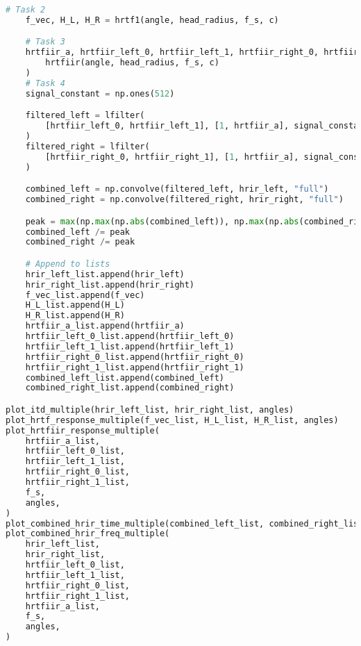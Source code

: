 \begin{lstlisting}[language=Python, caption={main.py}, label={lst:main.py}]
    # Task 2
    f_vec, H_L, H_R = hrtf1(angle, head_radius, f_s, c)

    # Task 3
    hrtfiir_a, hrtfiir_left_0, hrtfiir_left_1, hrtfiir_right_0, hrtfiir_right_1 = (
        hrtfiir(angle, head_radius, f_s, c)
    )
    # Task 4
    signal_constant = np.ones(512)

    filtered_left = lfilter(
        [hrtfiir_left_0, hrtfiir_left_1], [1, hrtfiir_a], signal_constant
    )
    filtered_right = lfilter(
        [hrtfiir_right_0, hrtfiir_right_1], [1, hrtfiir_a], signal_constant
    )

    combined_left = np.convolve(filtered_left, hrir_left, "full")
    combined_right = np.convolve(filtered_right, hrir_right, "full")

    peak = max(np.max(np.abs(combined_left)), np.max(np.abs(combined_right)))
    combined_left /= peak
    combined_right /= peak

    # Append to lists
    hrir_left_list.append(hrir_left)
    hrir_right_list.append(hrir_right)
    f_vec_list.append(f_vec)
    H_L_list.append(H_L)
    H_R_list.append(H_R)
    hrtfiir_a_list.append(hrtfiir_a)
    hrtfiir_left_0_list.append(hrtfiir_left_0)
    hrtfiir_left_1_list.append(hrtfiir_left_1)
    hrtfiir_right_0_list.append(hrtfiir_right_0)
    hrtfiir_right_1_list.append(hrtfiir_right_1)
    combined_left_list.append(combined_left)
    combined_right_list.append(combined_right)

plot_itd_multiple(hrir_left_list, hrir_right_list, angles)
plot_hrtf_response_multiple(f_vec_list, H_L_list, H_R_list, angles)
plot_hrtfiir_response_multiple(
    hrtfiir_a_list,
    hrtfiir_left_0_list,
    hrtfiir_left_1_list,
    hrtfiir_right_0_list,
    hrtfiir_right_1_list,
    f_s,
    angles,
)
plot_combined_hrir_time_multiple(combined_left_list, combined_right_list, angles)
plot_combined_hrir_freq_multiple(
    hrir_left_list,
    hrir_right_list,
    hrtfiir_left_0_list,
    hrtfiir_left_1_list,
    hrtfiir_right_0_list,
    hrtfiir_right_1_list,
    hrtfiir_a_list,
    f_s,
    angles,
)
\end{lstlisting}